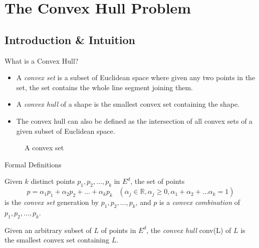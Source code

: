 \documentclass{beamer}
\begin{document}
\section{The Convex Hull Problem}
\subsection{Introduction \& Intuition}

\begin{frame}{What is a Convex Hull?}
    \begin{itemize}
        \item A \emph{convex set} is a subset of Euclidean space where given any two points in the set,  the set contains the whole line segment joining them.
        \item A  \emph{convex hull} of a shape is the smallest convex set containing the shape. 
        \item The convex hull can also be defined as the intersection of all convex
        sets of a given subset of Euclidean space. 
    \end{itemize}
    \begin{figure}
        \centering
        \caption{A convex set}
        \label{convex}
    \end{figure}
\end{frame}

\begin{frame}[t]{Formal Definitions}
    \begin{definition}
        Given $k$ distinct points $p_1, p_2, \dots, p_k$ in $E^d$, the set of points
        \[p = \alpha_1 p_1 + \alpha_2 p_2 + \dots + \alpha_k p_k
        \; \; \; (\alpha_j \in \mathbb{R}, \alpha_j \geq 0, \alpha_1 + \alpha_2 + \dots \alpha_k = 1)\]
        is the \textit{convex set} generation by $p_1, p_2, \dots, p_k$, and $p$ is a \textit{convex combination} of $p_1, p_2, \dots, p_k$.   
    \end{definition}
    \begin{definition}
        Given an arbitrary subset of $L$ of points in $E^d$, the \emph{convex hull} conv(L) of $L$ is the smallest convex set containing $L$. 
    \end{definition}
\end{frame}
\end{document}

